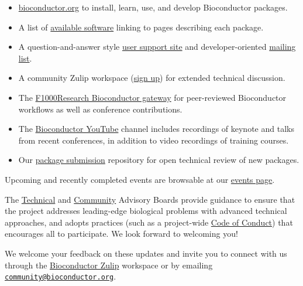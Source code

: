 \begin{itemize}
\tightlist
\item
  \href{https://bioconductor.org}{bioconductor.org} to install,
  learn, use, and develop Bioconductor packages.
\item
  A list of \href{https://bioconductor.org/packages}{available software}
  linking to pages describing each package.
\item
  A question-and-answer style
  \href{https://support.bioconductor.org}{user support site} and
  developer-oriented \href{https://stat.ethz.ch/mailman/listinfo/bioc-devel}{mailing list}.
\item
  A community Zulip workspace (\href{https://chat.bioconductor.org}{sign up})
  for extended technical discussion.
\item
  The \href{https://f1000research.com/gateways/bioconductor}{F1000Research Bioconductor gateway}
  for peer-reviewed Bioconductor workflows as well as conference contributions.
\item
  The \href{https://www.youtube.com/user/bioconductor}{Bioconductor YouTube}
  channel includes recordings of keynote and talks from recent
  conferences, in addition to
  video recordings of training courses.
\item
  Our \href{https://github.com/Bioconductor/Contributions}{package submission}
  repository for open technical review of new packages.
\end{itemize}

Upcoming and recently completed events are browsable at our
\href{https://bioconductor.org/help/events/}{events page}.

The \href{https://bioconductor.org/about/technical-advisory-board/}{Technical} and \href{https://bioconductor.org/about/community-advisory-board/}{Community}
Advisory Boards provide guidance to ensure that the project addresses
leading-edge biological problems with advanced technical approaches,
and adopts practices (such as a
project-wide \href{https://bioconductor.org/about/code-of-conduct/}{Code of Conduct})
that encourages all to participate. We look forward to
welcoming you!

We welcome your feedback on these updates and invite you to connect with us through the \href{https://chat.bioconductor.org}{Bioconductor Zulip} workspace or by emailing \href{mailto:community@bioconductor.org}{\nolinkurl{community@bioconductor.org}}.


\address{%
Maria Doyle, Bioconductor Community Manager\\
University of Limerick\\%
\\
%
%
%
%
}

\address{%
Bioconductor Core Developer Team\\
Dana-Farber Cancer Institute, Roswell Park Comprehensive Cancer Center, City University of New York, Fred Hutchinson Cancer Research Center, Mass General Brigham\\%
\\
%
%
%
%
}
